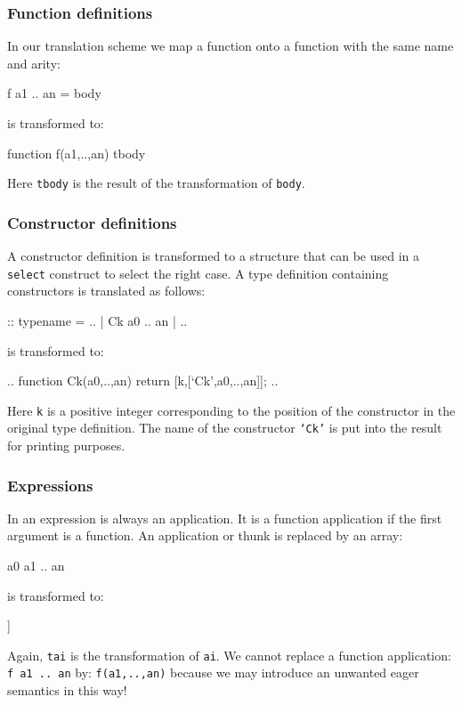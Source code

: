 \subsubsection{Function definitions} 
In our translation scheme we map a \Sapl function onto a \JS function with the same name and arity:
\begin{CleanCode}
f a1 .. an = body
\end{CleanCode}
is transformed to:
\begin{CleanCode}
function f(a1,..,an) { tbody }
\end{CleanCode}
Here \texttt{tbody} is the result of the transformation of \texttt{body}.

\subsubsection{Constructor definitions} 
A constructor definition is transformed to a structure that can be used in a \texttt{select} construct to 
select the right case. A \Sapl type definition containing constructors is translated as follows:
\begin{CleanCode}
:: typename = .. | Ck a0 .. an | ..
\end{CleanCode}
is transformed to:
\begin{CleanCode}
.. function Ck(a0,..,an) {return [k,[`Ck',a0,..,an]];} ..
\end{CleanCode}
Here \texttt{k} is a positive integer corresponding to the position of the constructor in
the original type definition. The name of the constructor \texttt{`Ck'} is put into the result for printing purposes.


\subsubsection{Expressions} 
In \Sapl an expression is always an application. It is a function application if the first argument is a function.
An application or thunk is replaced by an array:
\begin{CleanCode}
a0 a1 .. an 
\end{CleanCode}
is transformed to:
\begin{CleanCode}
[ta0,[ta1,..,tan]]
\end{CleanCode}
Again, \texttt{tai} is the transformation of \texttt{ai}.
We cannot replace a function application: \texttt{f a1 .. an} by: \texttt{f(a1,..,an)} because we may introduce
an unwanted  eager semantics in this way!

